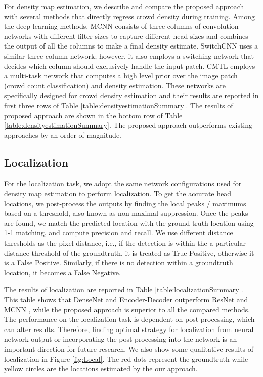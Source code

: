 \documentclass[runningheads]{llncs}
\begin{document}
For density map estimation, we describe and compare the proposed approach with several methods that directly regress crowd density during training. Among the deep learning methods, MCNN \cite{zhang2016single} consists of three columns of convolution networks with different filter sizes to capture different head sizes and combines the output of all the columns to make a final density estimate. SwitchCNN \cite{sam2017switching} uses a similar three column network; however, it also employs a switching network that decides which column should exclusively handle the input patch. CMTL \cite{sindagi2017cnn} employs a multi-task network that computes a high level prior over the image patch (crowd count classification) and density estimation. These networks are specifically designed for crowd density estimation and their results are reported in first three rows of Table \ref{table:densityestimationSummary}. The results of proposed approach are shown in the bottom row of Table \ref{table:densityestimationSummary}. The proposed approach outperforms existing approaches by an order of magnitude.


\subsection{Localization}\label{subsecLocalization}

For the localization task, we adopt the same network configurations used for density map estimation to perform localization. To get the accurate head locations, we post-process the outputs by finding the local peaks / maximums based on a threshold, also known as non-maximal suppression. Once the peaks are found, we match the predicted location with the ground truth location using 1-1 matching, and compute precision and recall. We use different distance thresholds as the pixel distance, i.e., if the detection is within the a particular distance threshold of the groundtruth, it is treated as True Positive, otherwise it is a False Positive. Similarly, if there is no detection within a groundtruth location, it becomes a False Negative.


The results of localization are reported in Table \ref{table:localizationSummary}. This table shows that DenseNet \cite{huang2016densely} and Encoder-Decoder \cite{badrinarayanan2015segnet} outperform ResNet \cite{he2016deep} and MCNN \cite{zhang2016single}, while the proposed approach is superior to all the compared methods. The performance on the localization task is dependent on post-processing, which can alter results. Therefore, finding optimal strategy for localization from neural network output or incorporating the post-processing into the network is an important direction for future research. We also show some qualitative results of localization in Figure \ref{fig:Local}. The red dots represent the groundtruth while yellow circles are the locations estimated by the our approach.
\end{document}
